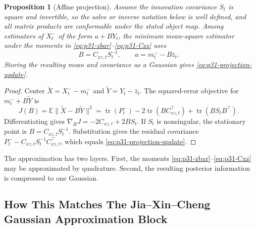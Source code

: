 \documentclass[11pt]{article}
\newtheorem{proposition}{Proposition}
\numberwithin{equation}{section}
\newcommand{\E}{\mathbb E}
\newcommand{\tr}{\operatorname{tr}}
\begin{document}
\begin{proposition}[Affine projection]
\label{prop:p31-affine-projection}
Assume the innovation covariance \(S_t\) is square and invertible, so the solve
or inverse notation below is well defined, and all matrix products are conformable
under the stated object map.  Among estimators of \(X_t^-\) of the form
\(a+B Y_t\), the minimum mean-square estimator under the moments in
\eqref{eq:p31-zbar}--\eqref{eq:p31-Cxz} uses
\begin{equation}
  B=C_{xz,t}S_t^{-1},
  \qquad
  a=m_t^- - B\bar z_t.
  \label{eq:p41-affine-projection-intercept}
\end{equation}
Storing the resulting mean and covariance as a Gaussian gives
\eqref{eq:p31-projection-update}.
\end{proposition}

\begin{proof}
Center \(\widetilde X=X_t^- -m_t^-\) and
\(\widetilde Y=Y_t-\bar z_t\).  The squared-error objective for
\(m_t^-+B\widetilde Y\) is
\begin{equation}
  J(B)=\E\|\widetilde X-B\widetilde Y\|^2
  =
  \tr(P_t^-)-2\tr(BC_{xz,t}^\top)+\tr(BS_tB^\top).
  \label{eq:p31-affine-objective}
\end{equation}
Differentiating gives \(\nabla_BJ=-2C_{xz,t}+2BS_t\).  If \(S_t\) is
nonsingular, the stationary point is \(B=C_{xz,t}S_t^{-1}\).  Substitution gives
the residual covariance \(P_t^- - C_{xz,t}S_t^{-1}C_{xz,t}^\top\), which equals
\eqref{eq:p31-projection-update}.
\end{proof}

The approximation has two layers.  First, the moments
\eqref{eq:p31-zbar}--\eqref{eq:p31-Cxz} may be approximated by quadrature.
Second, the resulting posterior information is compressed to one Gaussian.

\subsection{How This Matches The Jia--Xin--Cheng Gaussian Approximation Block}
\label{subsec:p32-jia-gaussian-block}
\end{document}
